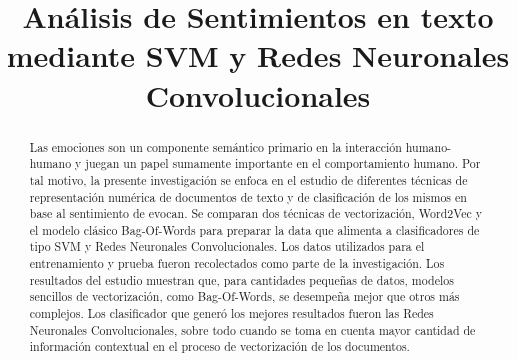 \documentclass[conference]{IEEEtran}
\begin{document}
	


\title{
	Análisis de Sentimientos en texto mediante SVM y Redes Neuronales Convolucionales
}

\author{
}

\maketitle




\begin{abstract}

	Las emociones son un componente semántico primario en la interacción humano-humano y juegan un papel sumamente importante en el comportamiento humano. Por tal motivo, la presente investigación se enfoca en el estudio de diferentes técnicas de representación numérica de documentos de texto y de clasificación de los mismos en base al sentimiento de evocan. Se comparan dos técnicas de vectorización, Word2Vec y el modelo clásico Bag-Of-Words para preparar la data que alimenta a clasificadores de tipo SVM y Redes Neuronales Convolucionales. Los datos utilizados para el entrenamiento y prueba fueron recolectados como parte de la investigación. Los resultados del estudio muestran que, para cantidades pequeñas de datos, modelos sencillos de vectorización, como Bag-Of-Words, se desempeña mejor que otros más complejos. Los clasificador que generó los mejores resultados fueron las Redes Neuronales Convolucionales, sobre todo cuando se toma en cuenta mayor cantidad de información contextual en el proceso de vectorización de los documentos.

\end{abstract}
\end{document}
